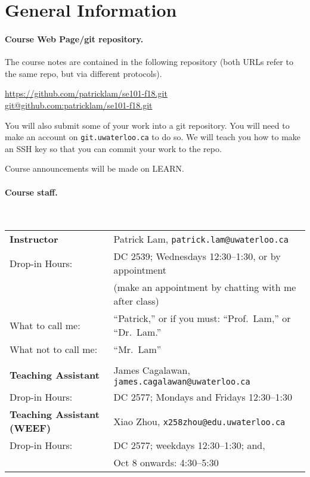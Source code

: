 \documentclass[11pt,onecolumn]{article}
\begin{document}
\section{General Information}

\paragraph{Course Web Page/git repository.} 

The course notes are contained in the following repository (both URLs
refer to the same repo, but via different protocols). 

\begin{center}
\url{https://github.com/patricklam/se101-f18.git}\\
\url{git@github.com:patricklam/se101-f18.git}
\end{center}

\noindent You will also submit some of your work into a git repository. You will
need to make an account on {\tt git.uwaterloo.ca} to do so. We will teach
you how to make an SSH key so that you can commit your work to the
repo.

\vspace*{1em} \noindent
Course announcements will be made on LEARN.


\newpage
\paragraph{Course staff.}~\\[1em]
\begin{tabular}{ll}
{\bf Instructor} & Patrick Lam, {\tt patrick.lam@uwaterloo.ca}\\
Drop-in Hours:& DC 2539; Wednesdays 12:30--1:30, or by appointment \\
& (make an appointment by chatting with me after class) \\

What to call me:& ``Patrick,'' or if you must: ``Prof.~Lam,'' or ``Dr.~Lam.''\\
What not to call me:& ``Mr.~Lam'' \\ \\

{\bf Teaching Assistant} &
James Cagalawan, {\tt james.cagalawan@uwaterloo.ca}\\
Drop-in Hours: & DC 2577; Mondays and Fridays 12:30--1:30 \\
{\bf Teaching Assistant (WEEF)} &
Xiao Zhou, {\tt x258zhou@edu.uwaterloo.ca}\\
Drop-in Hours: & DC 2577; weekdays 12:30--1:30; and, \\
& Oct 8 onwards: 4:30--5:30
\end{tabular}
\end{document}
